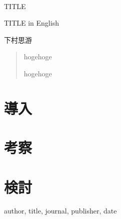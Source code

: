 \documentclass[10pt, a5paper, twoside]{jsarticle}
\theoremstyle{definition}
\begin{document}
	~ %

	\begin{center}

		\Large{TITLE}

		\vspace{3mm}

		\large{TITLE in English}

		\vspace{3mm}
		
		\large{下村思游}

	\end{center}

	\vspace{3mm}

	\begin{abstract}

		hogehoge

		\vspace{3mm}

		hogehoge

	\end{abstract}

	\section{導入}		

	\section{考察}

	\section{検討}

		

	\begin{thebibliography}{99}

		\bibitem{} author, title, journal, publisher, date

	\end{thebibliography}
\end{document}
